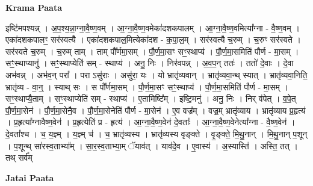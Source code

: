 \documentclass[17pt]{extarticle}
\begin{document}
\textbf{Krama Paata} \newline

इष्टि॑मपश्यन्न् । अ॒प॒श्य॒न्ना॒ग्ना॒वै॒ष्ण॒वम् । आ॒ग्ना॒वै॒ष्ण॒वमेका॑दशकपालम् । आ॒ग्ना॒वै॒ष्ण॒वमित्या᳚ग्ना - वै॒ष्ण॒वम् । एका॑दशकपालꣳ॒॒ सर॑स्वत्यै । एका॑दशकपाल॒मित्येका॑दश - क॒पा॒ल॒म् । सर॑स्वत्यै च॒रुम् । च॒रुꣳ सर॑स्वते । सर॑स्वते च॒रुम् । च॒रुम् ताम् । ताम् पौ᳚र्णमा॒सम् । पौ॒र्ण॒मा॒सꣳ सꣳ॒॒स्थाप्य॑ । पौ॒र्ण॒मा॒समिति॑ पौर्ण - मा॒सम् । सꣳ॒॒स्थाप्यानु॑ । सꣳ॒॒स्थाप्येति॑ सम् - स्थाप्य॑ । अनु॒ निः । निर॑वपन्न् । अ॒व॒प॒न् ततः॑ । ततो॑ दे॒वाः । दे॒वा अभ॑वन्न् । अभ॑व॒न् परा᳚ । परा ऽसु॑राः । असु॑रा॒ यः । यो भ्रातृ॑व्यवान् । भ्रातृ॑व्यवा॒न्थ् स्यात् । भ्रातृ॑व्यवा॒निति॒ भ्रातृ॑व्य - वा॒न्॒ । स्याथ् सः । स पौ᳚र्णमा॒सम् । पौ॒र्ण॒मा॒सꣳ सꣳ॒॒स्थाप्य॑ । पौ॒र्ण॒मा॒समिति॑ पौर्ण - मा॒सम् । सꣳ॒॒स्थाप्यै॒ताम् । सꣳ॒॒स्थाप्येति॑ सम् - स्थाप्य॑ । ए॒तामिष्टि᳚म् । इष्टि॒मनु॑ । अनु॒ निः । निर् व॑पेत् । व॒पे॒त् पौ॒र्ण॒मा॒सेन॑ । पौ॒र्ण॒मा॒सेनै॒व । पौ॒र्ण॒मा॒सेनेति॑ पौर्ण - मा॒सेन॑ । ए॒व वज्र᳚म् । वज्र॒म् भ्रातृ॑व्याय । भ्रातृ॑व्याय प्र॒हृत्य॑ । प्र॒हृत्या᳚ग्नावैष्ण॒वेन॑ । प्र॒हृत्येति॑ प्र - हृत्य॑ । आ॒ग्ना॒वै॒ष्ण॒वेन॑ दे॒वताः᳚ । आ॒ग्ना॒वै॒ष्ण॒वेनेत्या᳚ग्ना - वै॒ष्ण॒वेन॑ । दे॒वता᳚श्च । च॒ य॒ज्ञ्म् । य॒ज्ञ्म् च॑ । च॒ भ्रातृ॑व्यस्य । भ्रातृ॑व्यस्य वृङ्क्ते । वृ॒ङ्क्ते॒ मि॒थु॒नान् । मि॒थु॒नान् प॒शून् । प॒शून्थ् सा॑रस्व॒ताभ्या᳚म् । सा॒र॒स्व॒ताभ्या॒म् ॅयाव॑त् । याव॑दे॒व । ए॒वास्य॑ । अ॒स्यास्ति॑ । अस्ति॒ तत् । तथ् सर्व᳚म् \newline

\textbf{Jatai Paata} \newline
\end{document}
